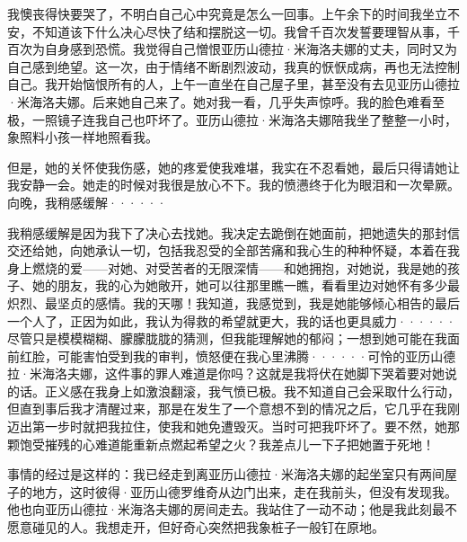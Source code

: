 \documentclass[12pt, UTF8]{ctexbook}
\begin{document}
\par 我懊丧得快要哭了，不明白自己心中究竟是怎么一回事。上午余下的时间我坐立不安，不知道该下什么决心尽快了结和摆脱这一切。我曾千百次发誓要理智从事，千百次为自身感到恐慌。我觉得自己憎恨亚历山德拉·米海洛夫娜的丈夫，同时又为自己感到绝望。这一次，由于情绪不断剧烈波动，我真的恹恹成病，再也无法控制自己。我开始恼恨所有的人，上午一直坐在自己屋子里，甚至没有去见亚历山德拉·米海洛夫娜。后来她自己来了。她对我一看，几乎失声惊呼。我的脸色难看至极，一照镜子连我自己也吓坏了。亚历山德拉·米海洛夫娜陪我坐了整整一小时，象照料小孩一样地照看我。
\par 但是，她的关怀使我伤感，她的疼爱使我难堪，我实在不忍看她，最后只得请她让我安静一会。她走的时候对我很是放心不下。我的愤懑终于化为眼泪和一次晕厥。向晚，我稍感缓解······
\par 我稍感缓解是因为我下了决心去找她。我决定去跪倒在她面前，把她遗失的那封信交还给她，向她承认一切，包括我忍受的全部苦痛和我心生的种种怀疑，本着在我身上燃烧的爱——对她、对受苦者的无限深情——和她拥抱，对她说，我是她的孩子、她的朋友，我的心为她敞开，她可以往那里瞧一瞧，看看里边对她怀有多少最炽烈、最坚贞的感情。我的天哪！我知道，我感觉到，我是她能够倾心相告的最后一个人了，正因为如此，我认为得救的希望就更大，我的话也更具威力······尽管只是模模糊糊、朦朦胧胧的猜测，但我能理解她的郁闷；一想到她可能在我面前红脸，可能害怕受到我的审判，愤怒便在我心里沸腾······可怜的亚历山德拉·米海洛夫娜，这件事的罪人难道是你吗？这就是我将伏在她脚下哭着要对她说的话。正义感在我身上如激浪翻滚，我气愤已极。我不知道自己会采取什么行动，但直到事后我才清醒过来，那是在发生了一个意想不到的情况之后，它几乎在我刚迈出第一步时就把我拉住，使我和她免遭毁灭。当时可把我吓坏了。要不然，她那颗饱受摧残的心难道能重新点燃起希望之火？我差点儿一下子把她置于死地！
\par 事情的经过是这样的：我已经走到离亚历山德拉·米海洛夫娜的起坐室只有两间屋子的地方，这时彼得·亚历山德罗维奇从边门出来，走在我前头，但没有发现我。他也向亚历山德拉·米海洛夫娜的房间走去。我站住了一动不动；他是我此刻最不愿意碰见的人。我想走开，但好奇心突然把我象桩子一般钉在原地。
\end{document}
